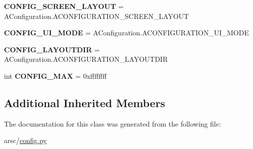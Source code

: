 \begin{DoxyCompactItemize}
{\bfseries C\+O\+N\+F\+I\+G\+\_\+\+S\+C\+R\+E\+E\+N\+\_\+\+L\+A\+Y\+O\+UT} = A\+Configuration.\+A\+C\+O\+N\+F\+I\+G\+U\+R\+A\+T\+I\+O\+N\+\_\+\+S\+C\+R\+E\+E\+N\+\_\+\+L\+A\+Y\+O\+UT
\item 
\mbox{\label{classarsc_1_1config_1_1ResTable__config_1_1Config_a49d212b1575ba404d072b46a691c17b9}} 
{\bfseries C\+O\+N\+F\+I\+G\+\_\+\+U\+I\+\_\+\+M\+O\+DE} = A\+Configuration.\+A\+C\+O\+N\+F\+I\+G\+U\+R\+A\+T\+I\+O\+N\+\_\+\+U\+I\+\_\+\+M\+O\+DE
\item 
\mbox{\label{classarsc_1_1config_1_1ResTable__config_1_1Config_a4dcae56207d064f1d2ea3f67f542bae0}} 
{\bfseries C\+O\+N\+F\+I\+G\+\_\+\+L\+A\+Y\+O\+U\+T\+D\+IR} = A\+Configuration.\+A\+C\+O\+N\+F\+I\+G\+U\+R\+A\+T\+I\+O\+N\+\_\+\+L\+A\+Y\+O\+U\+T\+D\+IR
\item 
\mbox{\label{classarsc_1_1config_1_1ResTable__config_1_1Config_a3d8b3f66fa630698badcd40397f61549}} 
int {\bfseries C\+O\+N\+F\+I\+G\+\_\+\+M\+AX} = 0xffffffff
\end{DoxyCompactItemize}
\subsection*{Additional Inherited Members}


The documentation for this class was generated from the following file\+:\begin{DoxyCompactItemize}
\item 
arsc/\mbox{\hyperlink{config_8py}{config.\+py}}\end{DoxyCompactItemize}
